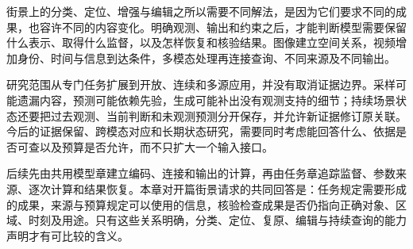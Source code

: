 街景上的分类、定位、增强与编辑之所以需要不同解法，是因为它们要求不同的成果，也容许不同的内容变化。明确观测、输出和约束之后，才能判断模型需要保留什么表示、取得什么监督，以及怎样恢复和核验结果。图像建立空间关系，视频增加身份、时间与信息到达条件，多模态处理再连接查询、不同来源及不同输出。

研究范围从专门任务扩展到开放、连续和多源应用，并没有取消证据边界。采样可能遗漏内容，预测可能依赖先验，生成可能补出没有观测支持的细节；持续场景状态还要把过去观测、当前判断和未观测预测分开保存，并允许新证据修订原关联。今后的证据保留、跨模态对应和长期状态研究，需要同时考虑能回答什么、依据是否可查以及预算是否允许，而不只扩大一个输入接口。

后续先由共用模型章建立编码、连接和输出的计算，再由任务章追踪监督、参数来源、逐次计算和结果恢复。本章对开篇街景请求的共同回答是：任务规定需要形成的成果，来源与预算规定可以使用的信息，核验检查成果是否仍指向正确对象、区域、时刻及用途。只有这些关系明确，分类、定位、复原、编辑与持续查询的能力声明才有可比较的含义。
